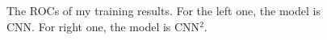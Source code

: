 \documentclass[12pt]{article}
\begin{document}
		\begin{figure}[htpb]
			\centering
			\caption{The ROCs of my training results. For the left one, the model is CNN. For right one, the model is CNN${}^{2}$.}
			\label{fig:ROCs_my}
		\end{figure}

\end{document}
